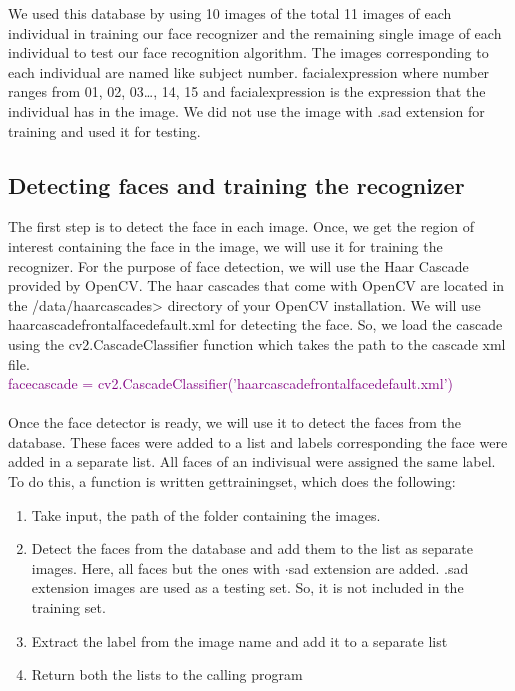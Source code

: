 \documentclass[a4paper,12pt]{article}
\begin{document}
We used this database by using 10 images of the total 11 images of each individual in training our face recognizer and the 
remaining single image of each individual to test our face recognition algorithm.
The images corresponding to each individual are named like subject number. facial\textunderscore expression where number ranges 
from 01, 02, 03…, 14, 15 and facial\textunderscore expression is the expression that the individual has in the image. We did not use the 
image with .sad extension for training and used it for testing.

\subsection{Detecting faces and training the recognizer}
The first step is to detect the face in each image. Once, we get the region of interest containing the face in the image, 
we will use it for training the recognizer. For the purpose of face detection, we will use the Haar Cascade provided by OpenCV. 
The haar cascades that come with OpenCV are located in the /data/haarcascades> directory of your OpenCV installation.
We will use haarcascade\textunderscore frontalface\textunderscore default.xml for detecting the face. So, we load the cascade using the cv2.CascadeClassifier 
function which takes the path to the cascade xml file.
\\
\newline \textcolor{purple}{face\textunderscore cascade = cv2.CascadeClassifier('haarcascade\textunderscore frontalface\textunderscore default.xml')}
\\
\\
Once the face detector is ready, we will use it to detect the faces from the database. These faces were added to a list and 
labels corresponding the face were added in a separate list. All faces of an indivisual were assigned the same label. To do this, 
a function is written get\textunderscore training\textunderscore set, which does the following:

\begin{enumerate}
 \item Take input, the path of the folder containing the images.
 \item Detect the faces from the database and add them to the list as separate images. Here, all faces but the ones 
 with $\cdot$sad extension are added. .sad extension images are used as a testing set. So, it is not included in the training set.
 \item Extract the label from the image name and add it to a separate list 
 \item Return both the lists to the calling program
\end{enumerate}
\end{document}
